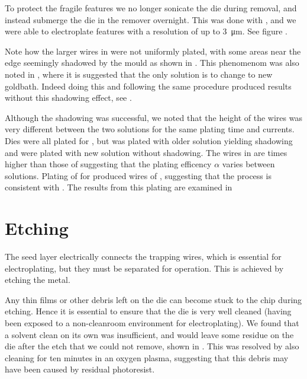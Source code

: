To protect the fragile features we no longer sonicate the die during removal,
and instead submerge the die in the remover overnight. This was done with
, and we were able to electroplate features with a
resolution of up to \SI{3}{\micro\meter}. See figure .

Note how the larger wires in  were not uniformly plated,
with some areas near the edge seemingly shadowed by the mould as shown in
. This phenomenom was also noted in
, where it is suggested that the only solution is to
change to new goldbath. Indeed doing this and following the same procedure
produced results without this shadowing effect, see .
%

Although the shadowing was successful, we noted that the height of the wires
was very different between the two solutions for the same plating time and
currents. Dies  were all plated for , but
 was plated with older solution yielding shadowing and  were
plated with new solution without shadowing. The wires in  are 
times higher than those of  suggesting that the plating efficency
$\alpha$ varies between solutions. Plating of  for  produced wires of , suggesting that the process is
consistent with . The results from this plating are
examined in 

\section{Etching}

The seed layer electrically connects the trapping wires, which is
essential for electroplating, but they must be separated for operation. This is
achieved by etching the metal.

Any thin films or other debris left on the die can become stuck to the chip
during etching. \cite{} Hence it is essential to ensure that the die is very
well cleaned (having been exposed to a non-cleanroom environment for
electroplating). We found that a solvent clean on its own was insufficient,
and would leave some residue on the die after the etch that we could not
remove, shown in . This was resolved by also cleaning
for ten minutes in an oxygen plasma, suggesting that this debris may have been
caused by residual photoresist.

